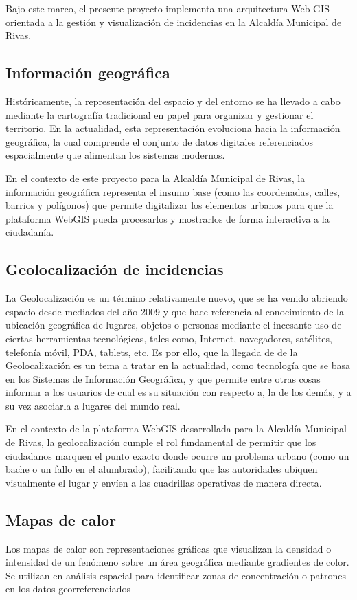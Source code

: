 Bajo este marco, el presente proyecto implementa una arquitectura Web GIS orientada a la gestión y visualización de incidencias en la Alcaldía Municipal de Rivas. 

\subsection{Información geográfica }
Históricamente, la representación del espacio y del entorno se ha llevado a cabo mediante la cartografía tradicional en papel para organizar y gestionar el territorio. En la actualidad, esta representación evoluciona hacia la información geográfica, la cual comprende el conjunto de datos digitales referenciados espacialmente que alimentan los sistemas modernos.\cite{lloret2008introduccion} 

En el contexto de este proyecto para la Alcaldía Municipal de Rivas, la información geográfica representa el insumo base (como las coordenadas, calles, barrios y polígonos) que permite digitalizar los elementos urbanos para que la plataforma WebGIS pueda procesarlos y mostrarlos de forma interactiva a la ciudadanía.

\subsection{Geolocalización de incidencias }
La Geolocalización es un término relativamente nuevo, que se ha venido abriendo espacio desde mediados del año 2009 y que hace referencia al conocimiento de la ubicación geográfica de lugares, objetos o personas mediante el incesante uso de ciertas herramientas tecnológicas, tales como, Internet, navegadores, satélites, telefonía móvil, PDA, tablets, etc. Es por ello, que la llegada de de la Geolocalización es un tema a tratar en la actualidad, como tecnología que se basa en los Sistemas de Información Geográfica, y que permite entre otras cosas informar a los usuarios de cual es su situación con respecto a, la de los demás, y a su vez asociarla a lugares del mundo real.  

En el contexto de la plataforma WebGIS desarrollada para la Alcaldía Municipal de Rivas, la geolocalización cumple el rol fundamental de permitir que los ciudadanos marquen el punto exacto donde ocurre un problema urbano (como un bache o un fallo en el alumbrado), facilitando que las autoridades ubiquen visualmente el lugar y envíen a las cuadrillas operativas de manera directa. \cite{florez2012tendencias}

\subsection{Mapas de calor }
Los mapas de calor son representaciones gráficas que visualizan la densidad o intensidad de un fenómeno sobre un área geográfica mediante gradientes de color. Se utilizan en análisis espacial para identificar zonas de concentración o patrones en los datos georreferenciados 

